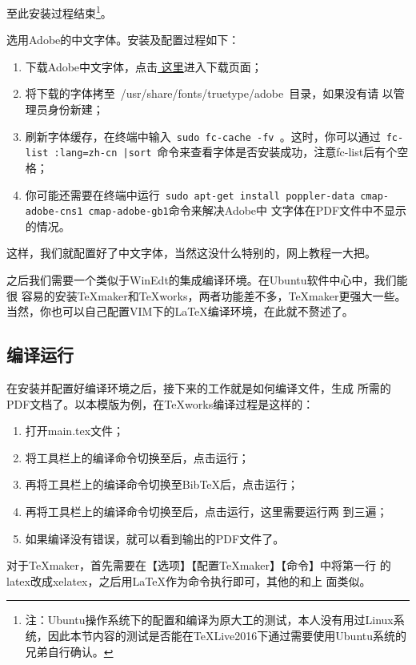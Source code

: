 至此安装过程结束\footnote{\kai 注：Ubuntu操作系统下的配置和编译为原大工的测试，本人没有用过Linux系统，因此本节内容的测试是否能在\TeX{}Live2016下通过需要使用Ubuntu系统的兄弟自行确认。}。

选用Adobe的中文字体。安装及配置过程如下：
\begin{enumerate}
\item 下载Adobe中文字体，点击\href{http://forum.ubuntu.org.cn/viewtopic.php?f=35&t=180987&start=0}{
    这里}进入下载页面；
\item 将下载的字体拷至~{/usr/share/fonts/truetype/adobe}~目录，如果没有请
  以管理员身份新建；
\item 刷新字体缓存，在终端中输入~\texttt{\footnotesize sudo fc-cache -fv }。这时，你可以通过~\texttt{\footnotesize fc-list :lang=zh-cn |sort}~命令来查看字体是否安装成功，注意fc-list后有个空格；
\item 你可能还需要在终端中运行~\texttt{\footnotesize sudo apt-get
    install poppler-data cmap-adobe-cns1 cmap-adobe-gb1}命令来解决Adobe中
  文字体在PDF文件中不显示的情况。
\end{enumerate}
这样，我们就配置好了中文字体，当然这没什么特别的，网上教程一大把。

之后我们需要一个类似于WinEdt的集成编译环境。在Ubuntu软件中心中，我们能很
容易的安装\TeX{}maker和\TeX{}works，两者功能差不多，\TeX{}maker更强大一些。
当然，你也可以自己配置VIM下的\LaTeX{}编译环境，在此就不赘述了。

\subsection{编译运行}


在安装并配置好编译环境之后，接下来的工作就是如何编译\XeLaTeX{}文件，生成
所需的PDF文档了。以本模版为例，在\TeX{}works编译过程是这样的：
\begin{enumerate}
\item 打开main.tex文件；
\item 将工具栏上的编译命令切换至\XeLaTeX{}后，点击运行；
\item 再将工具栏上的编译命令切换至Bib\TeX{}后，点击运行；
\item 再将工具栏上的编译命令切换至\XeLaTeX{}后，点击运行，这里需要运行两
  到三遍；
\item 如果编译没有错误，就可以看到输出的PDF文件了。
\end{enumerate}

对于\TeX{}maker，首先需要在【选项】【配置\TeX{}maker】【命令】中将第一行
的latex改成xelatex，之后用\LaTeX{}作为\XeLaTeX{}命令执行即可，其他的和上
面类似。

